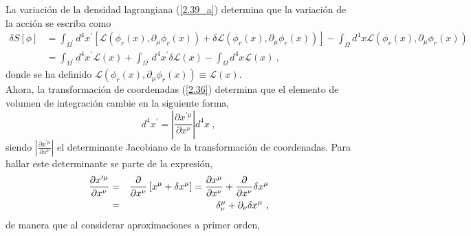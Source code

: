 \noindent
La variación de la densidad lagrangiana (\ref{2.39_a}) determina que la variación de la acción se escriba como
\begin{equation*}
\begin{split}
\delta S\left[ \phi \right] &=\int_{\Omega ^{\prime }}d^{4}x^{\prime }\left[ \mathcal{L}\left( \phi _{r}\left( x\right) ,\partial _{\mu }\phi _{r}\left(x\right) \right) +\delta \mathcal{L}\left( \phi _{r}\left( x\right),\partial _{\mu }\phi _{r}\left( x\right) \right) \right] -\int_{\Omega }d^{4}x\mathcal{L}\left( \phi _{r}\left( x\right) ,\partial _{\mu }\phi_{r}\left( x\right) \right) \\
&=\int_{\Omega ^{\prime }}d^{4}x^{\prime }\mathcal{L}\left( x\right)+\int_{\Omega ^{\prime }}d^{4}x^{\prime }\delta \mathcal{L}\left( x\right)-\int_{\Omega }d^{4}x\mathcal{L}\left( x\right) ~,
\end{split}
\end{equation*}
\noindent
donde se ha definido $\mathcal{L}\left( \phi_{r}\left( x\right) ,\partial _{\mu }\phi_{r}\left( x\right)\right)\equiv \mathcal{L}\left(x\right)$.\\

\noindent
Ahora, la transformación de coordenadas (\ref{2.36}) determina que el elemento de volumen de integración cambie en la siguiente forma,
\begin{equation}
d^{4}x^{\prime }=\left\vert \frac{\partial x^{\prime \mu }}{\partial x^{\nu }}\right\vert d^{4}x~,
\end{equation}
\noindent
siendo $\left\vert \frac{\partial x^{\prime \mu }}{\partial x^{\nu }}\right\vert$ el determinante Jacobiano de la transformación de coordenadas. Para hallar este determinante se parte de la expresión,
\begin{eqnarray}
\frac{\partial x^{\prime \mu }}{\partial x^{\nu }} &=&\frac{\partial }{%
\partial x^{\nu }}\left[ x^{\mu }+\delta x^{\mu }\right] =\frac{\partial
x^{\mu }}{\partial x^{\nu }}+\frac{\partial }{\partial x^{\nu }}\delta
x^{\mu }  \notag \\
&=&\delta _{\nu }^{\mu }+\partial _{\nu }\delta x^{\mu }~,
\end{eqnarray}
\noindent
de manera que al considerar aproximaciones a primer orden,
 
